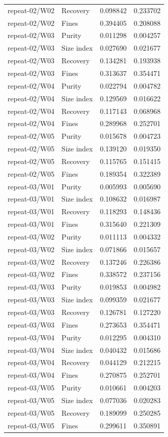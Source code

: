 \documentclass[10pt,a4paper]{article}
\begin{document}
{\begin{longtable}[]{@{}llll@{}}
repeat-02/W02 & Recovery & 0.098842 & 0.233702 \\
repeat-02/W02 & Fines & 0.394405 & 0.208088 \\
repeat-02/W03 & Purity & 0.011298 & 0.004257 \\
repeat-02/W03 & Size index & 0.027690 & 0.021677 \\
repeat-02/W03 & Recovery & 0.134281 & 0.193938 \\
repeat-02/W03 & Fines & 0.313637 & 0.354471 \\
repeat-02/W04 & Purity & 0.022794 & 0.004782 \\
repeat-02/W04 & Size index & 0.129569 & 0.016622 \\
repeat-02/W04 & Recovery & 0.117143 & 0.068968 \\
repeat-02/W04 & Fines & 0.289968 & 0.252701 \\
repeat-02/W05 & Purity & 0.015678 & 0.004723 \\
repeat-02/W05 & Size index & 0.139120 & 0.019350 \\
repeat-02/W05 & Recovery & 0.115765 & 0.151415 \\
repeat-02/W05 & Fines & 0.189354 & 0.322389 \\
repeat-03/W01 & Purity & 0.005993 & 0.005690 \\
repeat-03/W01 & Size index & 0.108632 & 0.016987 \\
repeat-03/W01 & Recovery & 0.118293 & 0.148436 \\
repeat-03/W01 & Fines & 0.315640 & 0.221309 \\
repeat-03/W02 & Purity & 0.011113 & 0.004332 \\
repeat-03/W02 & Size index & 0.071866 & 0.015657 \\
repeat-03/W02 & Recovery & 0.137246 & 0.226386 \\
repeat-03/W02 & Fines & 0.338572 & 0.237156 \\
repeat-03/W03 & Purity & 0.019853 & 0.004982 \\
repeat-03/W03 & Size index & 0.099359 & 0.021677 \\
repeat-03/W03 & Recovery & 0.126781 & 0.127220 \\
repeat-03/W03 & Fines & 0.273653 & 0.354471 \\
repeat-03/W04 & Purity & 0.012295 & 0.004310 \\
repeat-03/W04 & Size index & 0.040432 & 0.015686 \\
repeat-03/W04 & Recovery & 0.044129 & 0.212215 \\
repeat-03/W04 & Fines & 0.270875 & 0.252701 \\
repeat-03/W05 & Purity & 0.010661 & 0.004203 \\
repeat-03/W05 & Size index & 0.077036 & 0.020283 \\
repeat-03/W05 & Recovery & 0.189099 & 0.250285 \\
repeat-03/W05 & Fines & 0.299611 & 0.350891 \\
\end{longtable}\normalsize
}
\end{document}
